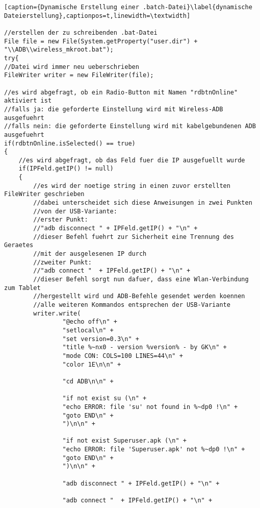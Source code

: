 \begin{flushleft}
\newpage
\begin{lstlisting}[caption={Dynamische Erstellung einer .batch-Datei}\label{dynamische Dateierstellung},captionpos=t,linewidth=\textwidth] 
 
//erstellen der zu schreibenden .bat-Datei
File file = new File(System.getProperty("user.dir") + "\\ADB\\wireless_mkroot.bat");
try{
//Datei wird immer neu ueberschrieben
FileWriter writer = new FileWriter(file);	

//es wird abgefragt, ob ein Radio-Button mit Namen "rdbtnOnline" aktiviert ist
//falls ja: die geforderte Einstellung wird mit Wireless-ADB ausgefuehrt
//falls nein: die geforderte Einstellung wird mit kabelgebundenen ADB ausgefuehrt
if(rdbtnOnline.isSelected() == true)
{
	//es wird abgefragt, ob das Feld fuer die IP ausgefuellt wurde
	if(IPFeld.getIP() != null)
	{
		//es wird der noetige string in einen zuvor erstellten FileWriter geschrieben
		//dabei unterscheidet sich diese Anweisungen in zwei Punkten
		//von der USB-Variante:
		//erster Punkt:
		//"adb disconnect " + IPFeld.getIP() + "\n" +
		//dieser Befehl fuehrt zur Sicherheit eine Trennung des Geraetes 
		//mit der ausgelesenen IP durch
		//zweiter Punkt:
		//"adb connect "  + IPFeld.getIP() + "\n" +
		//dieser Befehl sorgt nun dafuer, dass eine Wlan-Verbindung zum Tablet
		//hergestellt wird und ADB-Befehle gesendet werden koennen 
		//alle weiteren Kommandos entsprechen der USB-Variante
		writer.write(
				"@echo off\n" +
				"setlocal\n" +
				"set version=0.3\n" +
				"title %~nx0 - version %version% - by GK\n" +
				"mode CON: COLS=100 LINES=44\n" +
				"color 1E\n\n" +
				
				"cd ADB\n\n" +
				
				"if not exist su (\n" +
				"echo ERROR: file 'su' not found in %~dp0 !\n" +
				"goto END\n" +
				")\n\n" +

				"if not exist Superuser.apk (\n" +
				"echo ERROR: file 'Superuser.apk' not %~dp0 !\n" +
				"goto END\n" +
				")\n\n" +
				  
				"adb disconnect " + IPFeld.getIP() + "\n" +
				
				"adb connect "  + IPFeld.getIP() + "\n" +
				

\end{lstlisting}
\end{flushleft}
